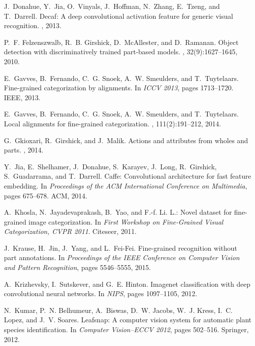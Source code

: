 \documentclass[10pt,twocolumn,letterpaper]{article}
\begin{document}
\begin{thebibliography}{10}
J.~Donahue, Y.~Jia, O.~Vinyals, J.~Hoffman, N.~Zhang, E.~Tzeng, and T.~Darrell.
\newblock Decaf: A deep convolutional activation feature for generic visual
  recognition.
, 2013.

P.~F. Felzenszwalb, R.~B. Girshick, D.~McAllester, and D.~Ramanan.
\newblock Object detection with discriminatively trained part-based models.
, 32(9):1627--1645, 2010.

E.~Gavves, B.~Fernando, C.~G. Snoek, A.~W. Smeulders, and T.~Tuytelaars.
\newblock Fine-grained categorization by alignments.
\newblock In {\em ICCV 2013}, pages 1713--1720. IEEE, 2013.

E.~Gavves, B.~Fernando, C.~G. Snoek, A.~W. Smeulders, and T.~Tuytelaars.
\newblock Local alignments for fine-grained categorization.
, 111(2):191--212,
  2014.

G.~Gkioxari, R.~Girshick, and J.~Malik.
\newblock Actions and attributes from wholes and parts.
, 2014.

Y.~Jia, E.~Shelhamer, J.~Donahue, S.~Karayev, J.~Long, R.~Girshick,
  S.~Guadarrama, and T.~Darrell.
\newblock Caffe: Convolutional architecture for fast feature embedding.
\newblock In {\em Proceedings of the ACM International Conference on
  Multimedia}, pages 675--678. ACM, 2014.

A.~Khosla, N.~Jayadevaprakash, B.~Yao, and F.-f. Li.
\newblock L.: Novel dataset for fine-grained image categorization.
\newblock In {\em First Workshop on Fine-Grained Visual Categorization, CVPR
  2011}. Citeseer, 2011.

J.~Krause, H.~Jin, J.~Yang, and L.~Fei-Fei.
\newblock Fine-grained recognition without part annotations.
\newblock In {\em Proceedings of the IEEE Conference on Computer Vision and
  Pattern Recognition}, pages 5546--5555, 2015.

A.~Krizhevsky, I.~Sutskever, and G.~E. Hinton.
\newblock Imagenet classification with deep convolutional neural networks.
\newblock In {\em NIPS}, pages 1097--1105, 2012.

N.~Kumar, P.~N. Belhumeur, A.~Biswas, D.~W. Jacobs, W.~J. Kress, I.~C. Lopez,
  and J.~V. Soares.
\newblock Leafsnap: A computer vision system for automatic plant species
  identification.
\newblock In {\em Computer Vision--ECCV 2012}, pages 502--516. Springer, 2012.


\end{thebibliography}
\end{document}
